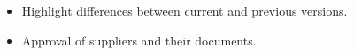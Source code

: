 \begin{itemize}
\item
Highlight differences between current and previous versions.
\item
Approval of suppliers and their documents.
\end{itemize}

